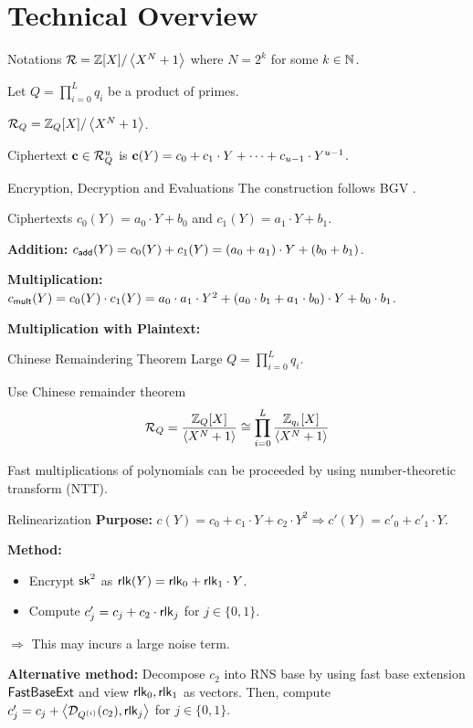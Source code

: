 \section{Technical Overview}
\begin{frame}{Notations}
	$\mathcal{R} = \mathbb{Z}[X] / \left\langle X^N + 1\right\rangle$ where $N = 2^k$ for some $k \in \mathbb{N}$.
	
	Let $Q = \prod_{i = 0}^L q_i$ be a product of primes.
	
	$\mathcal{R}_Q = \mathbb{Z}_Q[X]/ \left\langle X^N + 1\right\rangle$.
	
	Ciphertext $\mathbf{c} \in \mathcal{R}_Q^u$ is $\mathbf{c}(Y) = c_0 + c_1 \cdot Y + \dots + c_{u - 1} \cdot Y^{u-1}$.
\end{frame}

\begin{frame}{Encryption, Decryption and Evaluations}
	The construction follows BGV \cite{ITCS:BraGenVai12}.
	
	Ciphertexts $c_0(Y) = a_0\cdot Y + b_0$ and $c_1(Y) = a_1 \cdot Y + b_1$.
	
	\textbf{Addition:} $c_{\mathsf{add}}(Y) = c_0(Y) + c_1(Y) = (a_0 + a_1)\cdot Y + (b_0 + b_1)$.
	
	\textbf{Multiplication:} $c_{\mathsf{mult}}(Y) = c_0(Y)\cdot c_1(Y) = a_0\cdot a_1 \cdot Y^2 + (a_0\cdot b_1 + a_1 \cdot b_0) \cdot Y + b_0\cdot b_1$.
	
	\textbf{Multiplication with Plaintext:} 
	
\end{frame}

\begin{frame}{Chinese Remaindering Theorem}
	Large $Q = \prod_{i = 0}^L q_i$.
	
	Use Chinese remainder theorem
	\begin{equation*}
		\mathcal{R}_Q = \frac{\mathbb{Z}_Q[X]}{\left\langle X^N + 1\right\rangle} \cong \prod_{i = 0}^L \frac{\mathbb{Z}_{q_i}[X]}{\left\langle X^N + 1\right\rangle}
	\end{equation*}
	
	Fast multiplications of polynomials can be proceeded by using number-theoretic transform (NTT).
\end{frame}

\begin{frame}{Relinearization}
	\textbf{Purpose:} $c(Y) = c_0 + c_1 \cdot Y + c_2 \cdot Y^2 \Rightarrow c'(Y) = c'_0 + c'_1 \cdot Y$.
	
	\textbf{Method:}
	\begin{itemize}
		\item Encrypt $\mathsf{sk}^2$ as $\mathsf{rlk}(Y) = \mathsf{rlk}_0 + \mathsf{rlk}_1 \cdot Y$. 
		\item Compute $c'_j = c_j + c_2 \cdot \mathsf{rlk}_j$ for $j \in \{0,1\}$.
	\end{itemize} 
	
	$\Rightarrow$ This may incurs a large noise term.
	
	\textbf{Alternative method:} Decompose $c_2$ into RNS base by using fast base extension $\mathsf{FastBaseExt}$ and view $\mathsf{rlk}_0, \mathsf{rlk}_1$ as vectors. Then, compute $c'_j = c_j + \left\langle\mathcal{D}_{Q^{(i)}}(c_2),\mathsf{rlk}_j\right\rangle$ for $j \in \{0,1\}$.
\end{frame}

